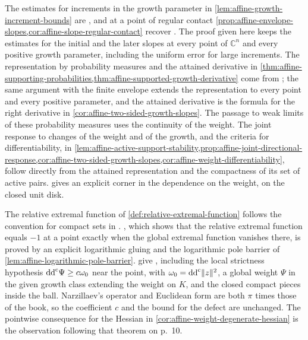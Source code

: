 The estimates for increments in the growth parameter in \cref{lem:affine-growth-increment-bounds} are \cite[v1, Lemma~3.1, p.~6]{NarzillaevWeighted26}, and at a point of regular contact \cref{prop:affine-envelope-slopes,cor:affine-slope-regular-contact} recover \cite[v1, Proposition~3.2, p.~7]{NarzillaevWeighted26}. The proof given here keeps the estimates for the initial and the later slopes at every point of $\mathbb C^n$ and every positive growth parameter, including the uniform error for large increments. The representation by probability measures and the attained derivative in \cref{thm:affine-supporting-probabilities,thm:affine-supported-growth-derivative} come from \cite[v1, Theorems~3.3--3.4, pp.~8--9]{NarzillaevWeighted26}; the same argument with the finite envelope extends the representation to every point and every positive parameter, and the attained derivative is the formula for the right derivative in \cref{cor:affine-two-sided-growth-slopes}. The passage to weak limits of these probability measures uses the continuity of the weight. The joint response to changes of the weight and of the growth, and the criteria for differentiability, in \cref{lem:affine-active-support-stability,prop:affine-joint-directional-response,cor:affine-two-sided-growth-slopes,cor:affine-weight-differentiability}, follow directly from the attained representation and the compactness of its set of active pairs.  gives an explicit corner in the dependence on the weight, on the closed unit disk.

The relative extremal function of \cref{def:relative-extremal-function} follows the convention for compact sets in \cite[v1, Section~2, equation~(8), p.~5]{NarzillaevWeighted26}. , which shows that the relative extremal function equals $-1$ at a point exactly when the global extremal function vanishes there, is proved by an explicit logarithmic gluing and the logarithmic pole barrier of \cref{lem:affine-logarithmic-pole-barrier}.  give \cite[v1, Lemma~4.1 and Theorem~4.2, p.~10]{NarzillaevWeighted26}, including the local strictness hypothesis $\mathrm{dd}^{\mathrm{c}}\Psi\geq c\omega_0$ near the point, with $\omega_0=\mathrm{dd}^{\mathrm{c}}\lVert z\rVert^2$, a global weight $\Psi$ in the given growth class extending the weight on $K$, and the closed compact pieces inside the ball. Narzillaev's operator and Euclidean form are both $\pi$ times those of the book, so the coefficient $c$ and the bound for the defect are unchanged. The pointwise consequence for the Hessian in \cref{cor:affine-weight-degenerate-hessian} is the observation following that theorem on p.~10.

